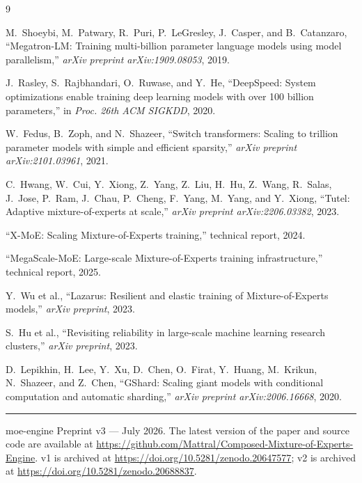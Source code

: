 \documentclass[11pt]{article}
\begin{document}
\begin{thebibliography}{9}

M.~Shoeybi, M.~Patwary, R.~Puri, P.~LeGresley, J.~Casper, and B.~Catanzaro,
``Megatron-LM: Training multi-billion parameter language models using
model parallelism,'' \emph{arXiv preprint arXiv:1909.08053}, 2019.

J.~Rasley, S.~Rajbhandari, O.~Ruwase, and Y.~He, ``DeepSpeed: System
optimizations enable training deep learning models with over 100 billion
parameters,'' in \emph{Proc. 26th ACM SIGKDD}, 2020.

W.~Fedus, B.~Zoph, and N.~Shazeer, ``Switch transformers: Scaling to
trillion parameter models with simple and efficient sparsity,'' \emph{arXiv
preprint arXiv:2101.03961}, 2021.

C.~Hwang, W.~Cui, Y.~Xiong, Z.~Yang, Z.~Liu, H.~Hu, Z.~Wang, R.~Salas,
J.~Jose, P.~Ram, J.~Chau, P.~Cheng, F.~Yang, M.~Yang, and Y.~Xiong, ``Tutel:
Adaptive mixture-of-experts at scale,'' \emph{arXiv preprint
arXiv:2206.03382}, 2023.

``X-MoE: Scaling Mixture-of-Experts training,'' technical report, 2024.

``MegaScale-MoE: Large-scale Mixture-of-Experts training infrastructure,''
technical report, 2025.

Y.~Wu et al., ``Lazarus: Resilient and elastic training of Mixture-of-Experts
models,'' \emph{arXiv preprint}, 2023.

S.~Hu et al., ``Revisiting reliability in large-scale machine learning
research clusters,'' \emph{arXiv preprint}, 2023.

D.~Lepikhin, H.~Lee, Y.~Xu, D.~Chen, O.~Firat, Y.~Huang, M.~Krikun,
N.~Shazeer, and Z.~Chen, ``GShard: Scaling giant models with conditional
computation and automatic sharding,'' \emph{arXiv preprint
arXiv:2006.16668}, 2020.

\end{thebibliography}

\vspace{1em}
\noindent\rule{\textwidth}{0.4pt}
\small
\noindent moe-engine Preprint v3 --- July 2026. The latest version of the
paper and source code are available at
\url{https://github.com/Mattral/Composed-Mixture-of-Experts-Engine}. v1 is
archived at \url{https://doi.org/10.5281/zenodo.20647577}; v2 is archived at
\url{https://doi.org/10.5281/zenodo.20688837}.
\end{document}
